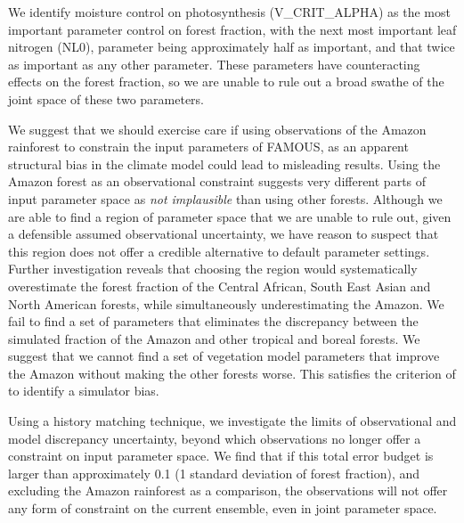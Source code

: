 \documentclass[esd, article]{copernicus} %
\begin{document}
We identify moisture control on photosynthesis (V\_CRIT\_ALPHA) as the most important parameter control on forest fraction, with the next most important leaf nitrogen (NL0), parameter being approximately half as important, and that twice as important as any other parameter. These parameters have counteracting effects on the forest fraction, so we are unable to rule out a broad swathe of the joint space of these two parameters.

We suggest that we should exercise care if using observations of the Amazon rainforest to constrain the input parameters of FAMOUS, as an apparent structural bias in the climate model could lead to misleading results. Using the Amazon forest as an observational constraint suggests very different parts of input parameter space as \emph{not implausible} than using other forests. Although we are able to find a region of parameter space that we are unable to rule out, given a defensible assumed observational uncertainty, we have reason to suspect that this region does not offer a credible alternative to default parameter settings. Further investigation reveals that choosing the region would systematically overestimate the forest fraction of the Central African, South East Asian and North American forests, while simultaneously underestimating the Amazon. We fail to find a set of parameters that eliminates the discrepancy between the simulated fraction of the Amazon and other tropical and boreal forests. We suggest that we cannot find a set of vegetation model parameters that improve the Amazon without making the other forests worse. This satisfies the criterion of \cite{williamson2014identifying} to identify a simulator bias. 

Using a history matching technique, we investigate the limits of observational and model discrepancy uncertainty, beyond which observations no longer offer a constraint on input parameter space. We find that if this total error budget is larger than approximately 0.1 (1 standard deviation of forest fraction), and excluding the Amazon rainforest as a comparison, the observations will not offer any form of constraint on the current ensemble, even in joint parameter space.
\end{document}
